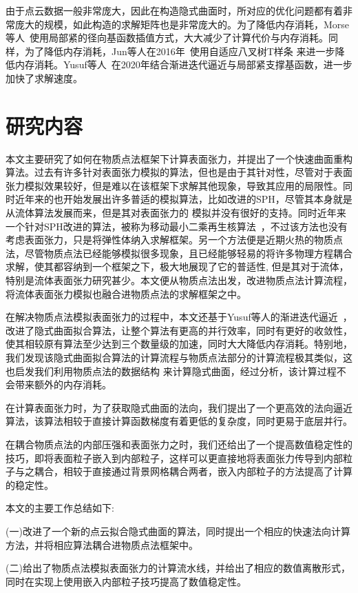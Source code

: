 由于点云数据一般非常庞大，因此在构造隐式曲面时，所对应的优化问题都有着非常庞大的规模，如此构造的求解矩阵也是非常庞大的。为了降低内存消耗，Morse等人~\cite{morse2005interpolating}使用局部紧的径向基函数插值方式，大大减少了计算代价与内存消耗。同样，为了降低内存消耗，Jun等人在2016年~\cite{wang2010adaptive}使用自适应八叉树T样条
来进一步降低内存消耗。Yusuf等人~\cite{hamza2020implicit}在2020年结合渐进迭代逼近与局部紧支撑基函数，进一步加快了求解速度。
\section{研究内容}
本文主要研究了如何在物质点法框架下计算表面张力，并提出了一个快速曲面重构算法。过去有许多针对表面张力模拟的算法，但也是由于其针对性，尽管对于表面张力模拟效果较好，但是难以在该框架下求解其他现象，导致其应用的局限性。同时近年来的也开始发展出许多普适的模拟算法，比如改进的SPH，尽管其本身就是从流体算法发展而来，但是其对表面张力的
模拟并没有很好的支持。同时近年来一个针对SPH改进的算法，被称为移动最小二乘再生核算法~\cite{chen2020moving}，不过该方法也没有考虑表面张力，只是将弹性体纳入求解框架。另一个方法便是近期火热的物质点法，尽管物质点法已经能够模拟很多现象，且已经能够轻易的将许多物理方程耦合求解，使其都容纳到一个框架之下，极大地展现了它的普适性,
但是其对于流体，特别是流体表面张力研究甚少。本文便从物质点法出发，改进物质点法计算流程，将流体表面张力模拟也融合进物质点法的求解框架之中。

在解决物质点法模拟表面张力的过程中，本文还基于Yusuf等人的渐进迭代逼近~\cite{hamza2020implicit}，改进了隐式曲面拟合算法，让整个算法有更高的并行效率，同时有更好的收敛性，使其相较原有算法至少达到三个数量级的加速，同时大大降低内存消耗。特别地，我们发现该隐式曲面拟合算法的计算流程与物质点法部分的计算流程极其类似，这也启发我们利用物质点法的数据结构
来计算隐式曲面，经过分析，该计算过程不会带来额外的内存消耗。

在计算表面张力时，为了获取隐式曲面的法向，我们提出了一个更高效的法向逼近算法，该算法相较于直接计算函数梯度有着更低的复杂度，同时更易于底层并行。

在耦合物质点法的内部压强和表面张力之时，我们还给出了一个提高数值稳定性的技巧，即将表面粒子嵌入到内部粒子，这样可以更直接地将表面张力传导到内部粒子与之耦合，相较于直接通过背景网格耦合两者，嵌入内部粒子的方法提高了计算的稳定性。

本文的主要工作总结如下:

(一)改进了一个新的点云拟合隐式曲面的算法，同时提出一个相应的快速法向计算方法，并将相应算法耦合进物质点法框架中。

(二)给出了物质点法模拟表面张力的计算流水线，并给出了相应的数值离散形式，同时在实现上使用嵌入内部粒子技巧提高了数值稳定性。

